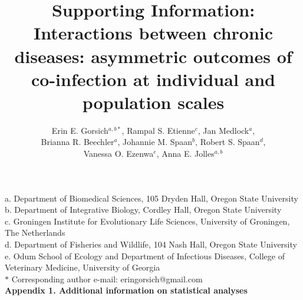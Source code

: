 \documentclass[11pt]{article}
\title{Supporting Information: \\
\textbf{Interactions between chronic diseases: asymmetric outcomes of co-infection at individual and population scales}}
\date{}
\author{Erin E. Gorsich$^{a,b*}$, Rampal S. Etienne$^{c}$, Jan Medlock$^{a}$, \\ Brianna R. Beechler$^{a}$, Johannie M. Spaan$^{b}$, Robert S. Spaan$^{d}$, \\Vanessa O. Ezenwa$^{e}$, Anna E. Jolles$^{a,b}$}
\begin{document}
\maketitle

\noindent{}a. Department of Biomedical Sciences, 105 Dryden Hall, Oregon State University \\
\noindent{}b. Department of Integrative Biology, Cordley Hall, Oregon State University \\
\noindent{}c. Groningen Institute for Evolutionary Life Sciences, University of Groningen, The Netherlands\\
\noindent{}d. Department of Fisheries and Wildlife, 104 Nash Hall, Oregon State University \\
\noindent{}e. Odum School of Ecology and Department of Infectious Diseases, College of Veterinary Medicine, University of Georgia \\
\noindent{}$ \ast$ Corresponding author e-mail: eringorsich@gmail.com \\



\noindent \Large{\textbf{Appendix 1. Additional information on statistical analyses}}\\
\end{document}
